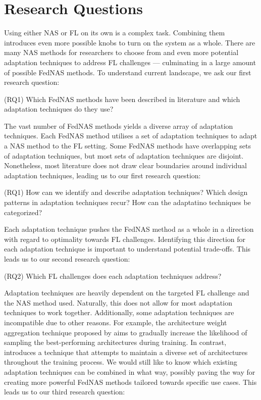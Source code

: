\section{Research Questions}

Using either NAS or FL on its own is a complex task. Combining them introduces even more possible knobs to turn on the system as a whole. There are many NAS methods for researchers to choose from and even more potential adaptation techniques to address FL challenges — culminating in a large amount of possible FedNAS methods. To understand current landscape, we ask our first research question:

(RQ1) Which FedNAS methods have been described in literature and which adaptation techniques do they use?

The vast number of FedNAS methods yields a diverse array of adaptation techniques. Each FedNAS method utilises a set of adaptation techniques to adapt a NAS method to the FL setting. Some FedNAS methods have overlapping sets of adaptation techniques, but most sets of adaptation techniques are disjoint. Nonetheless, most literature does not draw clear boundaries around individual adaptation techniques, leading us to our first research question:

\vspace{1em}
(RQ1) How can we identify and describe adaptation techniques? Which design patterns in adaptation techniques recur? How can the adaptatino techniques be categorized?
\vspace{1em}

Each adaptation technique pushes the FedNAS method as a whole in a direction with regard to optimality towards FL challenges. Identifying this direction for each adaptation technique is important to understand potential trade-offs. This leads us to our second research question:

\vspace{1em}
(RQ2) Which FL challenges does each adaptation techniques address?
\vspace{1em}

Adaptation techniques are heavily dependent on the targeted FL challenge and the NAS method used. Naturally, this does not allow for most adaptation techniques to work together. Additionally, some adaptation techniques are incompatible due to other reasons. For example, the architecture weight aggregation technique proposed by \cite{efnas_2024} aims to gradually increase the likelihood of sampling the best-performing architectures during training. In contrast, \cite{superfednas_2024} introduces a technique that attempts to maintain a diverse set of architectures throughout the training process. We would still like to know which existing adaptation techniques can be combined in what way, possibly paving the way for creating more powerful FedNAS methods tailored towards specific use cases. This leads us to our third research question:

